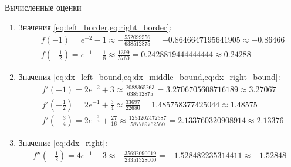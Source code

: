 \begin{remark}[точность \(\varepsilon = 10^{-5}\)] {Вычисленные оценки}
  \begin{enumerate}
    \item Значения \cref{eq:left_border,eq:right_border}:
      \begin{align*}
        &f(-1) = e^{-2} - 1 \approx -\frac{552099556}{638512875} = -0.8646647195641905 \approx -0.86466 \\
        &f(-\frac{1}{2}) = e^{-1} - \frac{1}{8} \approx \frac{1399}{5760} = 0.2428819444444444 \approx 0.24288
      \end{align*}
    \item Значения \cref{eq:dx_left_bound,eq:dx_middle_bound,eq:dx_right_bound}:
      \begin{align*}
        &f'(-1) = 2 e^{-2} + 3 \approx \frac{2088365263}{638512875} = 3.2706705608716189 \approx 3.27067 \\
        &f'(-\frac{1}{2}) = 2 e^{-1} + \frac{3}{4} \approx \frac{33697}{22680} = 1.485758377425044 \approx 1.48575 \\
        &f'(-\frac{3}{4}) = 2 e^{-\frac{3}{4}} + \frac{27}{16} \approx \frac{1254202472387}{587789762560} = 2.133760320908914 \approx 2.13376
      \end{align*}
    \item Значение \cref{eq:ddx_right}:
      \begin{align*}
        f''(-\frac{1}{2}) = 4 e^{-1} - 3 \approx -\frac{35692090019}{23351328000} = -1.528482235314411 \approx -1.52848
      \end{align*}
  \end{enumerate}
\end{remark}

